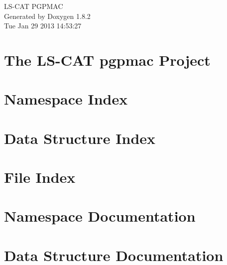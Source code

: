 \documentclass{book}
\begin{document}
\hypersetup{pageanchor=false,citecolor=blue}
\begin{titlepage}
\vspace*{7cm}
\begin{center}
{\Large L\-S-\/\-C\-A\-T P\-G\-P\-M\-A\-C }\\
\vspace*{1cm}
{\large Generated by Doxygen 1.8.2}\\
\vspace*{0.5cm}
{\small Tue Jan 29 2013 14:53:27}\\
\end{center}
\end{titlepage}
\clearemptydoublepage
{}
\tableofcontents
\clearemptydoublepage
{}
\hypersetup{pageanchor=true,citecolor=blue}
\chapter{The L\-S-\/\-C\-A\-T pgpmac Project}
\label{index}\hypertarget{index}{}
\chapter{Namespace Index}

\chapter{Data Structure Index}

\chapter{File Index}

\chapter{Namespace Documentation}


\chapter{Data Structure Documentation}



























\end{document}
